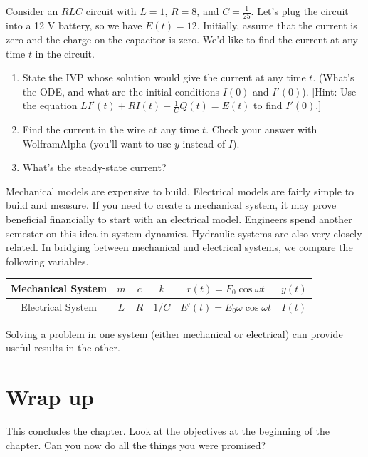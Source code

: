 \begin{problem}
Consider an $RLC$ circuit with $L=1$, $R=8$, and $C=\frac{1}{25}$. Let's plug the circuit into a 12 V battery, so we have $E(t) =12$.  Initially, assume that the current is zero and the charge on the capacitor is zero. We'd like to find the current at any time $t$ in the circuit.
\begin{enumerate}
 \item State the IVP whose solution would give the current at any time $t$. (What's the ODE, and what are the initial conditions $I(0)$ and $I'(0)$).  [Hint: Use the equation $L I'(t)+ RI(t)+ \frac{1}{C}Q(t) =E(t)$ to find $I'(0)$.] 
 \item Find the current in the wire at any time $t$. Check your answer with WolframAlpha (you'll want to use $y$ instead of $I$).
 \item What's the steady-state current?
\end{enumerate}

\end{problem}

\begin{observation}
Mechanical models are expensive to build.  Electrical models are fairly simple to build and measure.  If you need to create a mechanical system, it may prove beneficial financially to start with an electrical model. Engineers spend another semester on this idea in system dynamics.  Hydraulic systems are also very closely related. In bridging between mechanical and electrical systems, we compare the following variables. 
\begin{center}
\begin{tabular}{|c|c|c|c|c|c|}
\hline
Mechanical System&$m$&$c$&$k$&$r(t)=F_0\cos\omega t$&$y(t)$\\\hline
Electrical System&$L$&$R$&$1/C$&$E'(t) = E_0\omega\cos\omega t$&$I(t)$\\
\hline
\end{tabular}
\end{center}
Solving a problem in one system (either mechanical or electrical) can provide useful results in the other.  
\end{observation}



\section*{Wrap up}

This concludes the chapter.  Look at the objectives at the beginning of the chapter. Can you now do all the things you were promised? 


